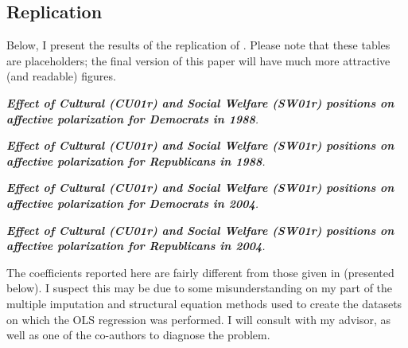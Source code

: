 \documentclass[12pt]{article}
\begin{document}
\subsection{Replication}

Below, I present the results of the replication of \citeauthor{iyengar2012affect}. Please note that these tables are placeholders; the final version of this paper will have much more attractive (and readable) figures.
\begin{table}[H]

\caption{\label{table} \textit{\textbf{Effect of Cultural (CU01r) and Social Welfare (SW01r) positions on affective polarization for Democrats in 1988}.}}
\end{table}

\begin{table}[H]

\caption{\label{table} \textit{\textbf{Effect of Cultural (CU01r) and Social Welfare (SW01r) positions on affective polarization for Republicans in 1988}.}}
\end{table}

\begin{table}[H]

\caption{\label{table} \textit{\textbf{Effect of Cultural (CU01r) and Social Welfare (SW01r) positions on affective polarization for Democrats in 2004}.}}
\end{table}


\begin{table}[H]

\caption{\label{table} \textit{\textbf{Effect of Cultural (CU01r) and Social Welfare (SW01r) positions on affective polarization for Republicans in 2004}.}}
\end{table}

The coefficients reported here are fairly different from those given in \citet{iyengar2012affect} (presented below). I suspect this may be due to some misunderstanding on my part of the multiple imputation and structural equation methods used to create the datasets on which the OLS regression was performed. I will consult with my advisor, as well as one of the co-authors to diagnose the problem.




\end{document}
